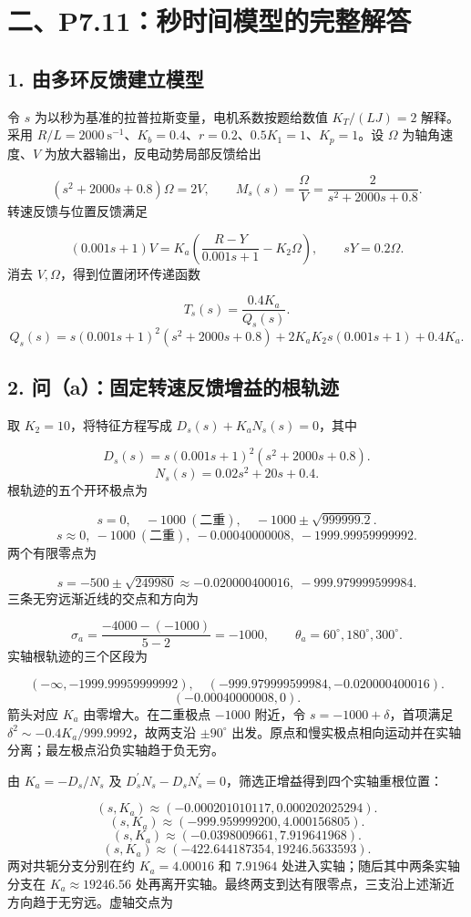 \documentclass[UTF8,a4paper,11pt]{ctexart}
\begin{document}
\section*{二、P7.11：秒时间模型的完整解答}
\subsection*{1. 由多环反馈建立模型}
令 $s$ 为以秒为基准的拉普拉斯变量，电机系数按题给数值 $K_T/(LJ)=2$ 解释。采用 $R/L=2000\ \mathrm{s}^{-1}$、$K_b=0.4$、$r=0.2$、$0.5K_1=1$、$K_p=1$。设 $\Omega$ 为轴角速度、$V$ 为放大器输出，反电动势局部反馈给出

\[(s^2+2000s+0.8)\Omega=2V,\qquad M_s(s)=\frac{\Omega}{V}=\frac2{s^2+2000s+0.8}.\]
转速反馈与位置反馈满足

\[(0.001s+1)V=K_a\left(\frac{R-Y}{0.001s+1}-K_2\Omega\right),\qquad sY=0.2\Omega.\]
消去 $V,\Omega$，得到位置闭环传递函数

\[T_s(s)=\frac{0.4K_a}{Q_s(s)}.\]
\[Q_s(s)=s(0.001s+1)^2(s^2+2000s+0.8)+2K_aK_2s(0.001s+1)+0.4K_a.\]
\subsection*{2. 问（a）：固定转速反馈增益的根轨迹}
取 $K_2=10$，将特征方程写成 $D_s(s)+K_aN_s(s)=0$，其中

\[D_s(s)=s(0.001s+1)^2(s^2+2000s+0.8).\]
\[N_s(s)=0.02s^2+20s+0.4.\]
根轨迹的五个开环极点为

\[s=0,\quad -1000\ (\text{二重}),\quad -1000\pm\sqrt{999999.2}.\]
\[s\approx0,\ -1000\ (\text{二重}),\ -0.00040000008,\ -1999.99959999992.\]
两个有限零点为

\[s=-500\pm\sqrt{249980}\approx-0.020000400016,\ -999.979999599984.\]
三条无穷远渐近线的交点和方向为

\[\sigma_a=\frac{-4000-(-1000)}{5-2}=-1000,\qquad \theta_a=60^\circ,180^\circ,300^\circ.\]
实轴根轨迹的三个区段为

\[(-\infty,-1999.99959999992),\quad(-999.979999599984,-0.020000400016).\]
\[(-0.00040000008,0).\]
箭头对应 $K_a$ 由零增大。在二重极点 $-1000$ 附近，令 $s=-1000+\delta$，首项满足 $\delta^2\sim-0.4K_a/999.9992$，故两支沿 $\pm90^\circ$ 出发。原点和慢实极点相向运动并在实轴分离；最左极点沿负实轴趋于负无穷。

由 $K_a=-D_s/N_s$ 及 $D_s^{\prime}N_s-D_sN_s^{\prime}=0$，筛选正增益得到四个实轴重根位置：

\[(s,K_a)\approx(-0.000201010117,0.000202025294).\]
\[(s,K_a)\approx(-999.959999200,4.000156805).\]
\[(s,K_a)\approx(-0.0398009661,7.919641968).\]
\[(s,K_a)\approx(-422.644187354,19246.5633593).\]
两对共轭分支分别在约 $K_a=4.00016$ 和 $7.91964$ 处进入实轴；随后其中两条实轴分支在 $K_a\approx19246.56$ 处再离开实轴。最终两支到达有限零点，三支沿上述渐近方向趋于无穷远。虚轴交点为
\end{document}
